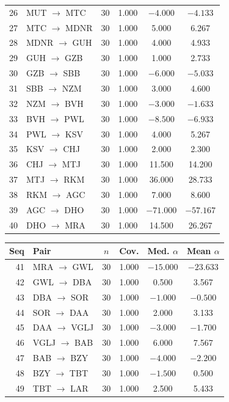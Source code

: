 \documentclass[conference]{IEEEtran}
\begin{document}
\begin{table}[!t]
\begin{minipage}[t]{0.485\textwidth}
\begin{tabular}{@{}rlcccc@{}}
26 & MUT $\to$ MTC & 30 & 1.000 & $-4.000$ & $-4.133$ \\
27 & MTC $\to$ MDNR & 30 & 1.000 & 5.000 & 6.267 \\
28 & MDNR $\to$ GUH & 30 & 1.000 & 4.000 & 4.933 \\
29 & GUH $\to$ GZB & 30 & 1.000 & 1.000 & 2.733 \\
30 & GZB $\to$ SBB & 30 & 1.000 & $-6.000$ & $-5.033$ \\
31 & SBB $\to$ NZM & 30 & 1.000 & 3.000 & 4.600 \\
32 & NZM $\to$ BVH & 30 & 1.000 & $-3.000$ & $-1.633$ \\
33 & BVH $\to$ PWL & 30 & 1.000 & $-8.500$ & $-6.933$ \\
34 & PWL $\to$ KSV & 30 & 1.000 & 4.000 & 5.267 \\
35 & KSV $\to$ CHJ & 30 & 1.000 & 2.000 & 2.300 \\
36 & CHJ $\to$ MTJ & 30 & 1.000 & 11.500 & 14.200 \\
37 & MTJ $\to$ RKM & 30 & 1.000 & 36.000 & 28.733 \\
38 & RKM $\to$ AGC & 30 & 1.000 & 7.000 & 8.600 \\
39 & AGC $\to$ DHO & 30 & 1.000 & $-71.000$ & $-57.167$ \\
40 & DHO $\to$ MRA & 30 & 1.000 & 14.500 & 26.267 \\
\bottomrule
\end{tabular}
\end{minipage}\hfill
\begin{minipage}[t]{0.485\textwidth}
\centering
\begin{tabular}{@{}rlcccc@{}}
\toprule
Seq & Pair & $n$ & Cov. & Med. $\alpha$ & Mean $\alpha$ \\
\midrule
41 & MRA $\to$ GWL & 30 & 1.000 & $-15.000$ & $-23.633$ \\
42 & GWL $\to$ DBA & 30 & 1.000 & 0.500 & 3.567 \\
43 & DBA $\to$ SOR & 30 & 1.000 & $-1.000$ & $-0.500$ \\
44 & SOR $\to$ DAA & 30 & 1.000 & 2.000 & 3.133 \\
45 & DAA $\to$ VGLJ & 30 & 1.000 & $-3.000$ & $-1.700$ \\
46 & VGLJ $\to$ BAB & 30 & 1.000 & 6.000 & 7.567 \\
47 & BAB $\to$ BZY & 30 & 1.000 & $-4.000$ & $-2.200$ \\
48 & BZY $\to$ TBT & 30 & 1.000 & $-1.500$ & 0.500 \\
49 & TBT $\to$ LAR & 30 & 1.000 & 2.500 & 5.433 \\

\end{tabular}
\end{minipage}
\end{table}
\end{document}
